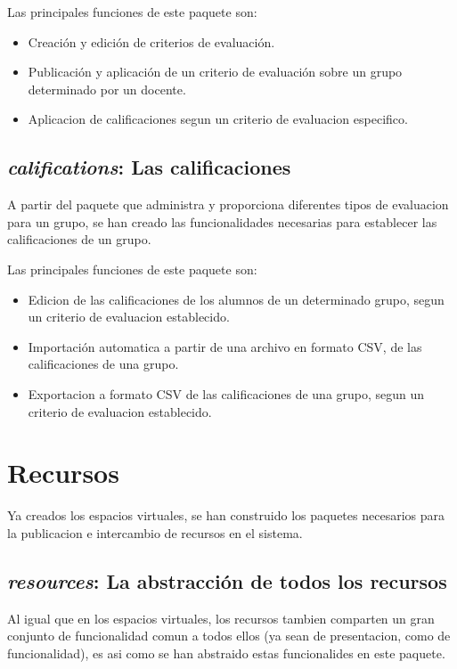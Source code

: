Las principales funciones de este paquete son:

\begin{itemize}
\item Creación y edición de criterios de evaluación.
\item Publicación y aplicación de un criterio de evaluación sobre un grupo
determinado por un docente.
\item Aplicacion de calificaciones segun un criterio de evaluacion especifico.
\end{itemize}

\subsection{\emph{califications}: Las calificaciones}
A partir del paquete que administra y proporciona diferentes tipos de evaluacion
para un grupo, se han creado las funcionalidades necesarias para establecer las
calificaciones de un grupo.

Las principales funciones de este paquete son:

\begin{itemize}
\item Edicion de las calificaciones de los alumnos de un determinado grupo,
segun un criterio de evaluacion establecido.
\item Importación automatica a partir de una archivo en formato CSV, de las
calificaciones de una grupo.
\item Exportacion a formato CSV de las calificaciones de una grupo, segun un
criterio de evaluacion establecido.
\end{itemize}

\section{Recursos}
Ya creados los espacios virtuales, se han construido los paquetes necesarios
para la publicacion e intercambio de recursos en el sistema.

\subsection{\emph{resources}: La abstracción de todos los recursos}
Al igual que en los espacios virtuales, los recursos tambien comparten un gran
conjunto de funcionalidad comun a todos ellos (ya sean de presentacion, como de
funcionalidad), es asi como se han abstraido estas funcionalides en este
paquete.

